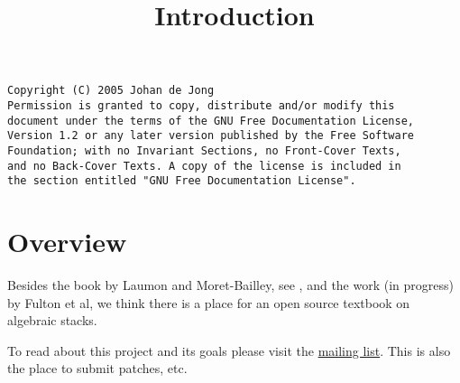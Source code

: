 

%


\title{Introduction}


\maketitle

\begin{verbatim}
Copyright (C) 2005 Johan de Jong
Permission is granted to copy, distribute and/or modify this
document under the terms of the GNU Free Documentation License,
Version 1.2 or any later version published by the Free Software
Foundation; with no Invariant Sections, no Front-Cover Texts,
and no Back-Cover Texts. A copy of the license is included in
the section entitled "GNU Free Documentation License".
\end{verbatim}

\tableofcontents

\section{Overview}
\label{section-overview}

\noindent
Besides the book by Laumon and Moret-Bailley, see \cite{LM-B}, and the work
(in progress) by Fulton et al, we think there is a place for an open source
textbook on algebraic stacks.

\smallskip\noindent
To read about this project and its goals please visit the
\href{http://www.math.columbia.edu/mailman/listinfo/algebraic_geometry}%
{mailing list}. This is also the place to submit patches, etc.







